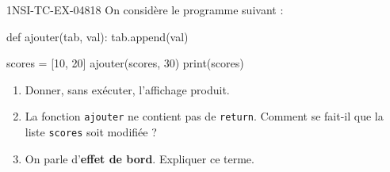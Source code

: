 \begin{exercice}{1NSI-TC-EX-048}{1}{8}
On considère le programme suivant :
\begin{python}
def ajouter(tab, val):
    tab.append(val)

scores = [10, 20]
ajouter(scores, 30)
print(scores)
\end{python}
\begin{enumerate}
  \item Donner, sans exécuter, l'affichage produit.
  \item La fonction \lstinline{ajouter} ne contient pas de \lstinline{return}.
        Comment se fait-il que la liste \lstinline{scores} soit modifiée ?
  \item On parle d'\textbf{effet de bord}. Expliquer ce terme.
\end{enumerate}
\end{exercice}
